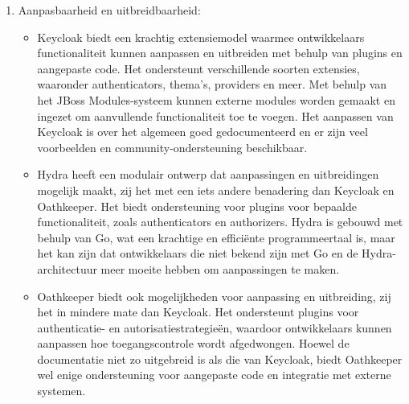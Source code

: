 \begin{enumerate}
  \item Aanpasbaarheid en uitbreidbaarheid:
  \begin{itemize}
    \item Keycloak biedt een krachtig extensiemodel waarmee ontwikkelaars functionaliteit kunnen aanpassen en uitbreiden met behulp van plugins en aangepaste code. Het ondersteunt verschillende soorten extensies, waaronder authenticators, thema's, providers en meer. Met behulp van het JBoss Modules-systeem kunnen externe modules worden gemaakt en ingezet om aanvullende functionaliteit toe te voegen. Het aanpassen van Keycloak is over het algemeen goed gedocumenteerd en er zijn veel voorbeelden en community-ondersteuning beschikbaar.
    \item Hydra heeft een modulair ontwerp dat aanpassingen en uitbreidingen mogelijk maakt, zij het met een iets andere benadering dan Keycloak en Oathkeeper. Het biedt ondersteuning voor plugins voor bepaalde functionaliteit, zoals authenticators en authorizers. Hydra is gebouwd met behulp van Go, wat een krachtige en efficiënte programmeertaal is, maar het kan zijn dat ontwikkelaars die niet bekend zijn met Go en de Hydra-architectuur meer moeite hebben om aanpassingen te maken.
    \item Oathkeeper biedt ook mogelijkheden voor aanpassing en uitbreiding, zij het in mindere mate dan Keycloak. Het ondersteunt plugins voor authenticatie- en autorisatiestrategieën, waardoor ontwikkelaars kunnen aanpassen hoe toegangscontrole wordt afgedwongen. Hoewel de documentatie niet zo uitgebreid is als die van Keycloak, biedt Oathkeeper wel enige ondersteuning voor aangepaste code en integratie met externe systemen.
  \end{itemize}
  

\end{enumerate}
